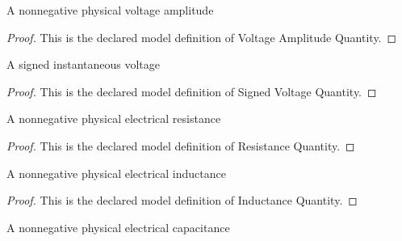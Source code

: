 \begin{definition}
  \label{def:physics:phyx-mini-0889:phyxminiproblems-problemphyxmini0889-voltageamplitudequantity}
  A nonnegative physical voltage amplitude
\end{definition}
\begin{proof}
  This is the declared model definition of Voltage Amplitude Quantity.
\end{proof}
\begin{definition}
  \label{def:physics:phyx-mini-0889:phyxminiproblems-problemphyxmini0889-signedvoltagequantity}
  A signed instantaneous voltage
\end{definition}
\begin{proof}
  This is the declared model definition of Signed Voltage Quantity.
\end{proof}
\begin{definition}
  \label{def:physics:phyx-mini-0889:phyxminiproblems-problemphyxmini0889-resistancequantity}
  A nonnegative physical electrical resistance
\end{definition}
\begin{proof}
  This is the declared model definition of Resistance Quantity.
\end{proof}
\begin{definition}
  \label{def:physics:phyx-mini-0889:phyxminiproblems-problemphyxmini0889-inductancequantity}
  A nonnegative physical electrical inductance
\end{definition}
\begin{proof}
  This is the declared model definition of Inductance Quantity.
\end{proof}
\begin{definition}
  \label{def:physics:phyx-mini-0889:phyxminiproblems-problemphyxmini0889-capacitancequantity}
  A nonnegative physical electrical capacitance
\end{definition}
